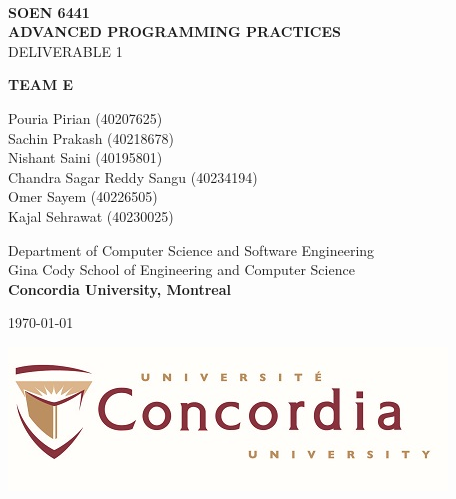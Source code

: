 \documentclass{report}
\begin{document}
\begin{titlepage}
  \begin{center}
    \textbf{\Large\\ SOEN 6441}
    \vspace{1cm}
    \textbf{\Huge\\ ADVANCED PROGRAMMING PRACTICES}
    \vspace{1cm}
    \Huge\\DELIVERABLE 1\\
    \vspace{1cm}

    \Large \textbf{TEAM E}\\
    \begin{large}
      \vspace{.5cm}
      Pouria Pirian (40207625)\\
      Sachin Prakash (40218678)\\
      Nishant	Saini (40195801)\\
      Chandra Sagar Reddy	Sangu (40234194)\\
      Omer Sayem (40226505)\\
      Kajal Sehrawat (40230025)\\
    \end{large}

    \begin{Large}  
      \vspace{1 cm}
      Department of Computer Science and Software Engineering \\
      Gina Cody School of Engineering and Computer Science \\
      \textbf{Concordia University, Montreal}\\
      \vspace{1 cm}
      
      \today \\
    \end{Large}
  \end{center}

  \vfill
  \begin{center}
    \includegraphics[width = 50ex]{resources/concordia_med.jpg}
  \end{center}
  
\end{titlepage}
\end{document}
